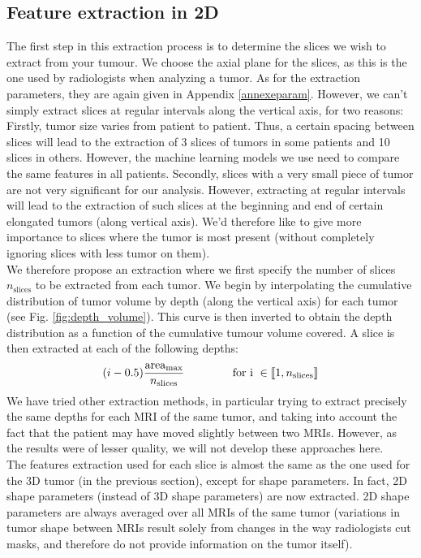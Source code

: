 \documentclass[preprint,12pt]{elsarticle}
\begin{document}
\subsection{Feature extraction in 2D}
\label{sec:2D}
The first step in this extraction process is to determine the slices we wish to extract from your tumour. We choose the axial plane for the slices, as this is the one used by radiologists when analyzing a tumor. As for the extraction parameters, they are again given in Appendix \ref{annexeparam}. However, we can't simply extract slices at regular intervals along the vertical axis, for two reasons:\\
\indent Firstly, tumor size varies from patient to patient. Thus, a certain spacing between slices will lead to the extraction of 3 slices of tumors in some patients and 10 slices in others. However, the machine learning models we use need to compare the same features in all patients. Secondly, slices with a very small piece of tumor are not very significant for our analysis. However, extracting at regular intervals will lead to the extraction of such slices at the beginning and end of certain elongated tumors (along vertical axis). We'd therefore like to give more importance to slices where the tumor is most present (without completely ignoring slices with less tumor on them).\\
\indent We therefore propose an extraction where we first specify the number of slices $n_{\text{slices}}$ to be extracted from each tumor. We begin by interpolating the cumulative distribution of tumor volume by depth (along the vertical axis) for each tumor (see Fig. \ref{fig:depth_volume}). This curve is then inverted to obtain the depth distribution as a function of the cumulative tumour volume covered. A slice is then extracted at each of the following depths: 
\begin{equation}
(i-0.5) \displaystyle{\frac{\text{area}_{\text{max}}}{n_{\text{slices}}}} \hspace{1.5 cm} \text{for i } \in \llbracket 1,n_{\text{slices}}  \rrbracket
\end{equation}
We have tried other extraction methods, in particular trying to extract precisely the same depths for each MRI of the same tumor, and taking into account the fact that the patient may have moved slightly between two MRIs. However, as the results were of lesser quality, we will not develop these approaches here.\\
\indent The features extraction used for each slice is almost the same as the one used for the 3D tumor (in the previous section), except for shape parameters. In fact, 2D shape parameters (instead of 3D shape parameters) are now extracted. 2D shape parameters are always averaged over all MRIs of the same tumor (variations in tumor shape between MRIs result solely from changes in the way radiologists cut masks, and therefore do not provide information on the tumor itself).\\
\end{document}
